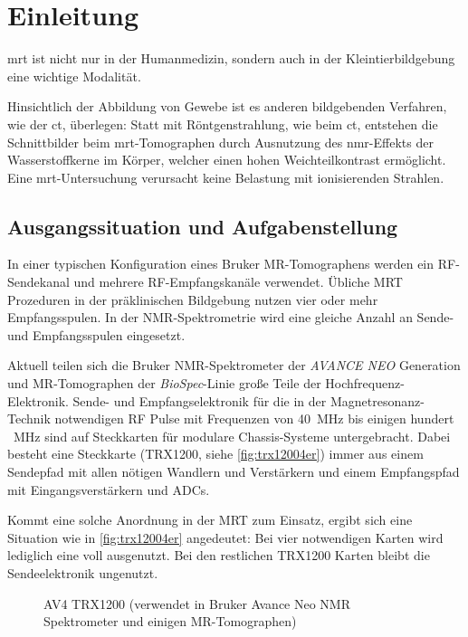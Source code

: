 \chapter{Einleitung}

\gls{mrt} ist nicht nur in der Humanmedizin, sondern auch in der Kleintierbildgebung eine wichtige Modalität.

 Hinsichtlich der Abbildung von Gewebe ist es anderen bildgebenden Verfahren, wie der \gls{ct}, überlegen: Statt mit Röntgenstrahlung, wie beim \gls{ct}, entstehen die Schnittbilder beim \gls{mrt}-Tomographen durch Ausnutzung des \gls{nmr}-Effekts der Wasserstoffkerne im Körper, welcher einen hohen Weichteilkontrast ermöglicht. Eine \gls{mrt}-Untersuchung verursacht keine Belastung mit ionisierenden Strahlen.
 
\section{Ausgangssituation und Aufgabenstellung}
In einer typischen Konfiguration eines Bruker MR-Tomographens werden ein RF-Sendekanal und mehrere RF-Empfangskanäle verwendet. Übliche MRT Prozeduren in der präklinischen Bildgebung nutzen vier oder mehr Empfangsspulen. In der NMR-Spektrometrie wird eine gleiche Anzahl an Sende- und Empfangsspulen eingesetzt.

Aktuell teilen sich die Bruker NMR-Spektrometer der \textit{AVANCE NEO} Generation und MR-Tomographen der \textit{BioSpec}-Linie große Teile der Hochfrequenz-Elektronik. Sende- und Empfangselektronik für die in der Magnetresonanz-Technik notwendigen RF Pulse mit Frequenzen von \SI{40}{\mega\hertz} bis einigen hundert \SI{}{\mega\hertz} sind auf Steckkarten für modulare Chassis-Systeme untergebracht. Dabei besteht eine Steckkarte (TRX1200, siehe \autoref{fig:trx12004er}) immer aus einem Sendepfad mit allen nötigen Wandlern und Verstärkern und einem Empfangspfad mit Eingangsverstärkern und ADCs.

Kommt eine solche Anordnung in der MRT zum Einsatz, ergibt sich eine Situation wie in \autoref{fig:trx12004er} angedeutet: Bei vier notwendigen Karten wird lediglich eine voll ausgenutzt. Bei den restlichen TRX1200 Karten bleibt die Sendeelektronik ungenutzt.

\begin{figure}[H]
	\centering
	\caption[Bruker Avance Neo TRX1200 Karte]{AV4 TRX1200 (verwendet in Bruker Avance Neo NMR Spektrometer und einigen MR-Tomographen)}
	\label{fig:trx12004er}
\end{figure}

